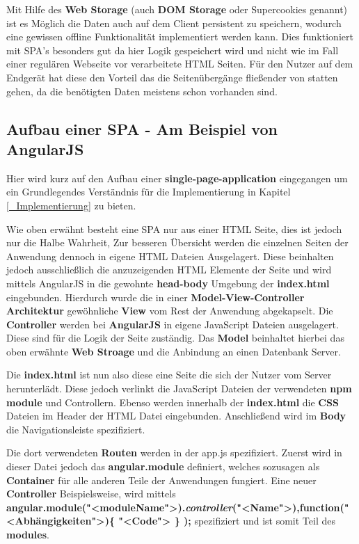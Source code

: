 Mit Hilfe des \textbf{Web Storage} (auch \textbf{DOM Storage} oder Supercookies genannt) ist es Möglich die Daten auch auf dem Client persistent zu speichern, wodurch eine gewissen offline Funktionalität implementiert werden kann. Dies funktioniert mit SPA's besonders gut da hier Logik gespeichert wird und nicht wie im Fall einer regulären Webseite vor verarbeitete HTML Seiten. Für den Nutzer auf dem Endgerät hat diese den Vorteil das die Seitenübergänge fließender von statten gehen, da die benötigten Daten meistens schon vorhanden sind.

\subsection{Aufbau einer SPA - Am Beispiel von AngularJS}
Hier wird kurz auf den Aufbau einer \textbf{single-page-application} eingegangen um ein Grundlegendes Verständnis für die Implementierung in Kapitel \ref{_Implementierung} zu bieten.

Wie oben erwähnt besteht eine SPA nur aus einer HTML Seite, dies ist jedoch nur die Halbe Wahrheit, Zur besseren Übersicht werden die einzelnen Seiten der Anwendung dennoch in eigene HTML Dateien Ausgelagert. Diese beinhalten jedoch ausschließlich die anzuzeigenden HTML Elemente der Seite und wird mittels AngularJS in die gewohnte \textbf{head-body} Umgebung der \textbf{index.html} eingebunden. Hierdurch wurde die in einer \textbf{Model-View-Controller Architektur} gewöhnliche \textbf{View} vom Rest der Anwendung abgekapselt. Die \textbf{Controller} werden bei \textbf{AngularJS} in eigene JavaScript Dateien ausgelagert. Diese sind für die Logik der Seite zuständig. Das \textbf{Model} beinhaltet hierbei das oben erwähnte \textbf{Web Stroage} und die Anbindung an einen Datenbank Server.

Die \textbf{index.html} ist nun also diese eine Seite die sich der Nutzer vom Server herunterlädt. Diese jedoch verlinkt die JavaScript Dateien der verwendeten \textbf{npm module} und Controllern. Ebenso werden innerhalb der \textbf{index.html} die \textbf{CSS} Dateien im Header der HTML Datei eingebunden. Anschließend wird im \textbf{Body} die Navigationsleiste spezifiziert.

Die dort verwendeten \textbf{Routen} werden in der app.js spezifiziert. Zuerst wird in dieser Datei jedoch das \textbf{angular.module} definiert, welches sozusagen als \textbf{Container} für alle anderen Teile der Anwendungen fungiert. Eine neuer \textbf{Controller} Beispielsweise, wird mittels \\ \textbf{angular.module("<moduleName">).\textit{controller}("<Name">),function("<Abhängigkeiten">)\{ "<Code"> \} );} spezifiziert und ist somit Teil des \textbf{modules}.

